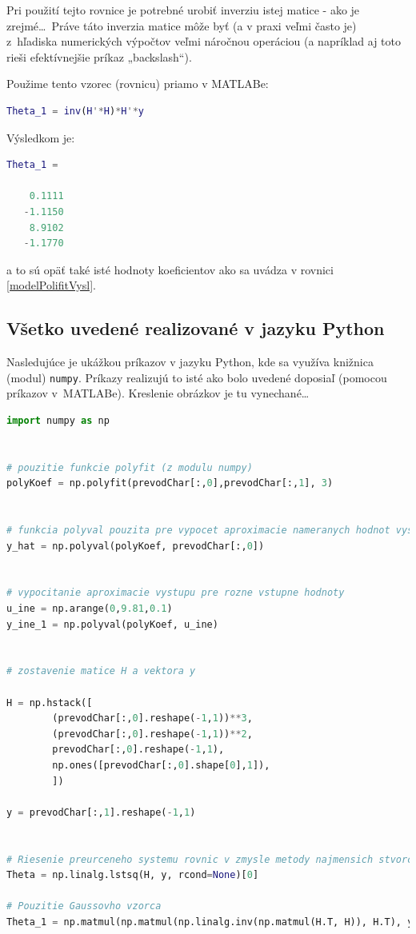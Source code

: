 \documentclass[a4paper, 10pt, ]{article}
\begin{document}
Pri použití tejto rovnice je potrebné urobiť inverziu istej matice - ako je zrejmé\ldots \  Práve táto inverzia matice môže byť (a v praxi veľmi často je) z~hľadiska numerických výpočtov veľmi náročnou operáciou (a napríklad aj toto rieši efektívnejšie príkaz „backslash“).

Použime tento vzorec (rovnicu) priamo v MATLABe:
\begin{lstlisting}[language=Matlab,]
Theta_1 = inv(H'*H)*H'*y
\end{lstlisting}
Výsledkom je:
\begin{lstlisting}[language=Matlab,]
Theta_1 =

    0.1111
   -1.1150
    8.9102
   -1.1770
\end{lstlisting}
a to sú opäť také isté hodnoty koeficientov ako sa uvádza v rovnici \eqref{modelPolifitVysl}.








\subsection{Všetko uvedené realizované v jazyku Python}


Nasledujúce je ukážkou príkazov v jazyku Python, kde sa využíva knižnica (modul) \verb|numpy|. Príkazy realizujú to isté ako bolo uvedené doposiaľ (pomocou príkazov v~MATLABe). Kreslenie obrázkov je tu vynechané\ldots



\begin{lstlisting}[language=Python,]
import numpy as np


# pouzitie funkcie polyfit (z modulu numpy)
polyKoef = np.polyfit(prevodChar[:,0],prevodChar[:,1], 3)


# funkcia polyval pouzita pre vypocet aproximacie nameranych hodnot vystupu
y_hat = np.polyval(polyKoef, prevodChar[:,0])


# vypocitanie aproximacie vystupu pre rozne vstupne hodnoty
u_ine = np.arange(0,9.81,0.1)
y_ine_1 = np.polyval(polyKoef, u_ine)


# zostavenie matice H a vektora y

H = np.hstack([
        (prevodChar[:,0].reshape(-1,1))**3,
        (prevodChar[:,0].reshape(-1,1))**2,
        prevodChar[:,0].reshape(-1,1),
        np.ones([prevodChar[:,0].shape[0],1]),
        ])

y = prevodChar[:,1].reshape(-1,1)


# Riesenie preurceneho systemu rovnic v zmysle metody najmensich stvorcov
Theta = np.linalg.lstsq(H, y, rcond=None)[0]

# Pouzitie Gaussovho vzorca
Theta_1 = np.matmul(np.matmul(np.linalg.inv(np.matmul(H.T, H)), H.T), y)

\end{lstlisting}
\end{document}
